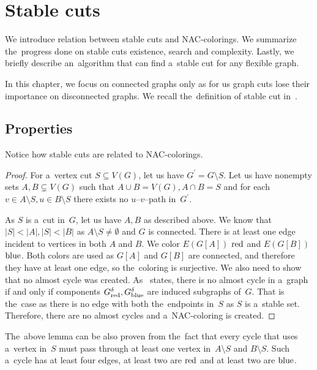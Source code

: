 
\chapter{Stable cuts}%
\label{chapter:stable_cuts}

\begin{chapterabstract}
	We introduce relation between stable cuts and NAC-colorings.
	We summarize the~progress done on stable cuts existence, search and complexity.
	Lastly, we briefly describe an~algorithm that can find a~stable cut
	for any flexible graph.
\end{chapterabstract}


In this chapter, we focus on connected graphs only as for us graph cuts
lose their importance on disconnected graphs.
We recall the~definition of
stable cut in~.

\section{Properties}

Notice how stable cuts are related to NAC-colorings.
%
%
\begin{proof}
	For a~vertex cut \( S \subseteq V(G) \), let us have \( G^\prime = G \setminus S \).
	Let us have nonempty sets \( A, B \subsetneq V(G) \) such that
	\( A \cup B = V(G), A \cap B = S \) and for each \( v \in A \setminus S, u \in B \setminus S \)
	there exists no \( u \)--\( v \)--path in~\( G^\prime \).

	As \( S \) is a~cut in~\( G \), let us have \( A, B \) as described above.
	We know that \( |S| < |A|, |S| < |B| \)
	as \( A\setminus S \ne \emptyset{} \) and \( G \) is connected.
	There is at least one edge incident to vertices in both \( A \) and \( B \).
	We color \( E(G[A]) \) \( \text{red} \) and \( E(G[B]) \) \( \text{blue} \).
	Both colors are used as \( G[A] \) and \( G[B] \) are connected,
	and therefore they have at least one edge,
	so the~coloring is surjective.
	We also need to show that no almost cycle was created.
	As~
	states, there is no almost cycle in a~graph if and only
	if components \( G_{\text{red}}^\delta, G_{\text{blue}}^\delta \)
	are induced subgraphs of~\( G \).
	That is the~case as there is no edge with both the~endpoints in~\( S \)
	as \( S \) is a~stable set.
	Therefore, there are no almost cycles and a~NAC-coloring is created.
\end{proof}
%
The~above lemma can be also proven from the~fact that every cycle that
uses a~vertex in~\( S \) must pass
through at least one vertex in~\( A \setminus S \) and \( B \setminus S \).
Such a~cycle has at least four edges,
at least two are \( \text{red} \) and at least two are \( \text{blue} \).

